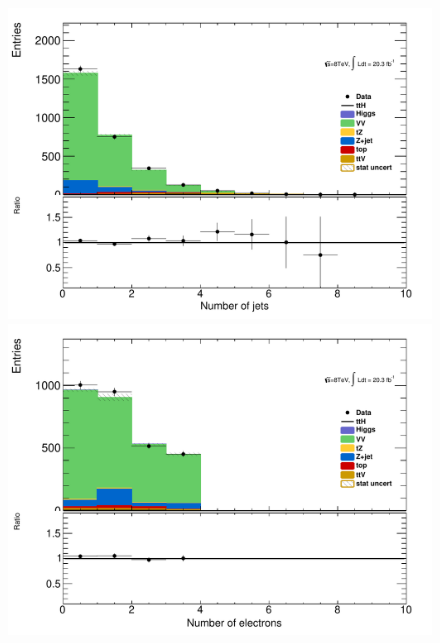 \begin{figure}[!htbp]
  \begin{minipage}[h]{0.5\textwidth}
    \centering \includegraphics[width=\textwidth]{figs/wz/plotCand_3lep_VV_NJet}
  \end{minipage}\hfill
  \begin{minipage}[h]{0.5\textwidth}
    \centering \includegraphics[width=\textwidth]{figs/wz/plotCand_3lep_VV_NElec}
  \end{minipage}\hfill
  \begin{minipage}[h]{0.5\textwidth}

\end{minipage}
\end{figure}
